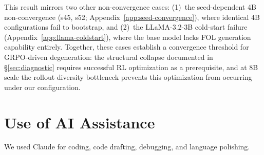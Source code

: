 This result mirrors two other non-convergence cases: (1)~the seed-dependent 4B non-convergence (s45, s52; Appendix~\ref{app:seed-convergence}), where identical 4B configurations fail to bootstrap, and (2)~the LLaMA-3.2-3B cold-start failure (Appendix~\ref{app:llama-coldstart}), where the base model lacks FOL generation capability entirely.
Together, these cases establish a convergence threshold for GRPO-driven degeneration: the structural collapse documented in \S\ref{sec:diagnostic} requires successful RL optimization as a prerequisite, and at 8B scale the rollout diversity bottleneck prevents this optimization from occurring under our configuration.

\section{Use of AI Assistance}
We used Claude for coding, code drafting, debugging, and language polishing.
